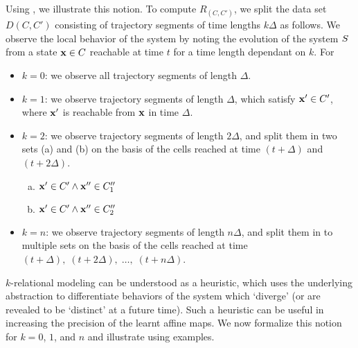 Using , we illustrate this notion. To compute
$R_{(C,C')}$, we
split the data set $D(C,C')$ consisting of trajectory segments of time lengths
$k\Delta$ as follows.  We observe the local behavior of the system by
noting the evolution of the system $S$ from a state $\mathbf{x} \in C$
reachable at time $t$ for a time length dependant on $k$. For
\begin{itemize}
    \item{$k=0$}: we observe all trajectory segments of length $\Delta$.
    \item{$k=1$}: we observe trajectory segments of length $\Delta$,
        which satisfy $\mathbf{x}'\in C'$, where $\mathbf{x}'$ is reachable from
        $\mathbf{x}$ in time $\Delta$.
    \item{$k=2$}: we observe trajectory segments of length $2\Delta$,
        and split them in two sets (a) and (b) on the basis of the
        cells reached at time $(t+\Delta)$ and $(t+2\Delta)$.
        \begin{enumerate}[(a)]
            \item $\mathbf{x}' \in C' \land \mathbf{x}''\in C''_1$
            \item $\mathbf{x}' \in C' \land \mathbf{x}'' \in C''_2$
        \end{enumerate}
    \item{$k=n$}: we observe trajectory segments of length $n\Delta$,
        and split them in to multiple sets on the basis of the cells
        reached at time $(t+\Delta),\; (t+2\Delta),\;
        \ldots,\;(t+n\Delta)$.
\end{itemize}

$k$-relational modeling can be understood as a heuristic, which uses
the underlying abstraction to differentiate behaviors of the system
which `diverge' (or are revealed to be `distinct' at a future time).
Such a heuristic can be useful in increasing the precision of the
learnt affine maps.  We now formalize this notion for $k=0$, $1$, and
$n$ and illustrate using examples.


